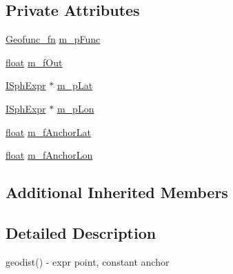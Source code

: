 \subsection*{Private Attributes}
\begin{DoxyCompactItemize}
\item 
\hyperlink{sphinxexpr_8cpp_a162dd05806302c01435e9c554f017be4}{Geofunc\-\_\-fn} \hyperlink{classExpr__GeodistConst__c_aa4d343f0388abcc150e37020ae904137}{m\-\_\-p\-Func}
\item 
\hyperlink{sphinxexpr_8cpp_a0e0d0739f7035f18f949c2db2c6759ec}{float} \hyperlink{classExpr__GeodistConst__c_ad56d9631d73a2ab4fb496693417023c1}{m\-\_\-f\-Out}
\item 
\hyperlink{structISphExpr}{I\-Sph\-Expr} $\ast$ \hyperlink{classExpr__GeodistConst__c_a299fd0f469597f30c3b358a8410bd7d8}{m\-\_\-p\-Lat}
\item 
\hyperlink{structISphExpr}{I\-Sph\-Expr} $\ast$ \hyperlink{classExpr__GeodistConst__c_aa6d0faa1b2dccf6e7fedfbd4beac12e8}{m\-\_\-p\-Lon}
\item 
\hyperlink{sphinxexpr_8cpp_a0e0d0739f7035f18f949c2db2c6759ec}{float} \hyperlink{classExpr__GeodistConst__c_ae58116a4b85aaccecf81d30873cc308c}{m\-\_\-f\-Anchor\-Lat}
\item 
\hyperlink{sphinxexpr_8cpp_a0e0d0739f7035f18f949c2db2c6759ec}{float} \hyperlink{classExpr__GeodistConst__c_a3c7c121935daea2cd701606118c50662}{m\-\_\-f\-Anchor\-Lon}
\end{DoxyCompactItemize}
\subsection*{Additional Inherited Members}


\subsection{Detailed Description}
geodist() -\/ expr point, constant anchor 

